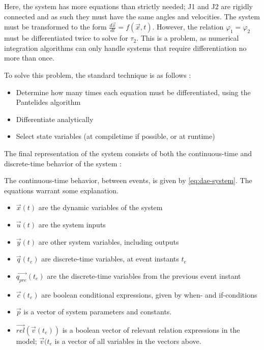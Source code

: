 \documentclass[\rootfolder/main.tex]{subfiles}
\begin{document}
Here, the system has more equations than strictly needed;
J1 and J2 are rigidly connected and as such they must have the same angles and velocities.
The system must be transformed to the form $\frac{d\vec{x}}{dt} = f\left(\vec{x}, t\right)$.
However, the relation $\varphi_{1} = \varphi_{2}$ must be differentiated twice to solve for $\tau_{2}$.
This is a problem, as numerical integration algorithms can only handle systems that require differentiation no more than once.

To solve this problem, the standard technique is as follows \cite{clauss2002}:
\begin{itemize}
    \item Determine how many times each equation must be differentiated, using the Pantelides algorithm
    \item Differentiate analytically
    \item Select state variables (at compiletime if possible, or at runtime)
\end{itemize}

The final representation of the system consists of both the continuous-time and discrete-time behavior of the system \cite{openmodelica.org:lundvall:sims:2005}:


The continuous-time behavior, between events, is given by \cref{eq:dae-system}.
The equations warrant some explanation.

\begin{itemize}[noitemsep]
    \item $\vec{x}(t)$ are the dynamic variables of the system
    \item $\vec{u}(t)$ are the system inputs
    \item $\vec{y}(t)$ are other system variables, including outputs
    \item $\vec{q}(t_{e})$ are discrete-time variables, at event instants $t_{e}$
    \item $\vec{q_{pre}}(t_{e})$ are the discrete-time variables from the previous event instant
    \item $\vec{c}(t_{e})$ are boolean conditional expressions, given by when- and if-conditions
    \item $\vec{p}$ is a vector of system parameters and constants.
    \item $\vec{rel}(\vec{v}(t_{e}))$ is a boolean vector of relevant relation expressions in the model; $\vec{v}(t_{e}$ is a vector of all variables in the vectors above.
\end{itemize}
\end{document}

